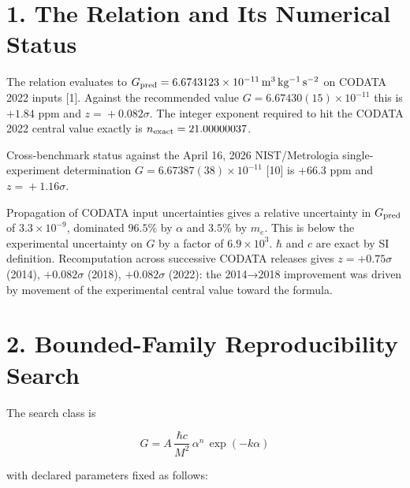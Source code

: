\documentclass[
  11pt,
  letterpaper,
  twocolumn,
]{article}
\begin{document}
\section{1. The Relation and Its Numerical
Status}\label{the-relation-and-its-numerical-status}

The relation evaluates to
\(G_{\rm pred} = 6.6743123 \times 10^{-11}\,\mathrm{m^3\,kg^{-1}\,s^{-2}}\)
on CODATA 2022 inputs {[}1{]}. Against the recommended value
\(G = 6.67430(15) \times 10^{-11}\) this is \(+1.84\) ppm and
\(z\!=\!+0.082\sigma\). The integer exponent required to hit the CODATA
2022 central value exactly is \(n_{\rm exact} = 21.00000037\).

Cross-benchmark status against the April 16, 2026 NIST/Metrologia
single-experiment determination \(G = 6.67387(38) \times 10^{-11}\)
{[}10{]} is \(+66.3\) ppm and \(z\!=\!+1.16\sigma\).

Propagation of CODATA input uncertainties gives a relative uncertainty
in \(G_{\rm pred}\) of \(3.3 \times 10^{-9}\), dominated \(96.5\%\) by
\(\alpha\) and \(3.5\%\) by \(m_e\). This is below the experimental
uncertainty on \(G\) by a factor of \(6.9 \times 10^3\). \(\hbar\) and
\(c\) are exact by SI definition. Recomputation across successive CODATA
releases gives \(z = +0.75\sigma\) (2014), \(+0.082\sigma\) (2018),
\(+0.082\sigma\) (2022): the 2014→2018 improvement was driven by
movement of the experimental central value toward the formula.

\section{2. Bounded-Family Reproducibility
Search}\label{bounded-family-reproducibility-search}

The search class is

\[G = A\,\frac{\hbar c}{M^2}\,\alpha^n\,\exp(-k\alpha)\]

with declared parameters fixed as follows:
\end{document}
